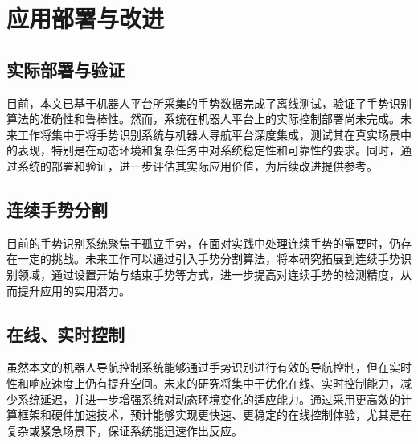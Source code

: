 

\section{应用部署与改进}
\subsection{实际部署与验证}
目前，本文已基于机器人平台所采集的手势数据完成了离线测试，验证了手势识别算法的准确性和鲁棒性。然而，系统在机器人平台上的实际控制部署尚未完成。未来工作将集中于将手势识别系统与机器人导航平台深度集成，测试其在真实场景中的表现，特别是在动态环境和复杂任务中对系统稳定性和可靠性的要求。同时，通过系统的部署和验证，进一步评估其实际应用价值，为后续改进提供参考。
\subsection{连续手势分割}
目前的手势识别系统聚焦于孤立手势，在面对实践中处理连续手势的需要时，仍存在一定的挑战。未来工作可以通过引入手势分割算法，将本研究拓展到连续手势识别领域，通过设置开始与结束手势等方式，进一步提高对连续手势的检测精度，从而提升应用的实用潜力。
\subsection{在线、实时控制}
虽然本文的机器人导航控制系统能够通过手势识别进行有效的导航控制，但在实时性和响应速度上仍有提升空间。未来的研究将集中于优化在线、实时控制能力，减少系统延迟，并进一步增强系统对动态环境变化的适应能力。通过采用更高效的计算框架和硬件加速技术，预计能够实现更快速、更稳定的在线控制体验，尤其是在复杂或紧急场景下，保证系统能迅速作出反应。

